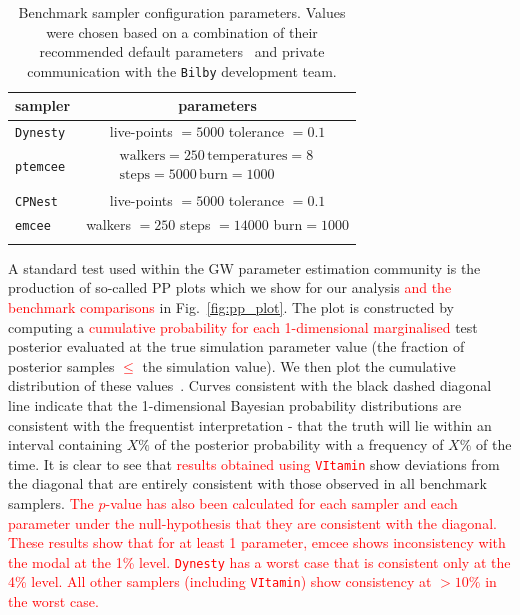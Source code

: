 \documentclass[%
showpacs,
nofootinbib,
 amsmath,amssymb,
 aps,
 twocolumn,
 prl,
 reprint,
floatfix,
]{revtex4-1}
\newcommand{\new}[1]{\textcolor{red}{#1}}
\begin{document}
%
%
\begin{table}
\centering
\caption{Benchmark sampler configuration parameters. Values were chosen based
on a combination of their recommended default parameters~\cite{1811.02042} and
private communication with the \texttt{Bilby} development team. }
\begin{tabular}[t]{lc}
\toprule
sampler & parameters \\
\hline
\texttt{Dynesty}~\cite{dynesty} & live-points $=5000$ tolerance $=0.1$ \\
\texttt{ptemcee}~\cite{ptemcee} & $\begin{array}{c}\text{walkers}=250\,
\text{temperatures}=8\,
\\ \text{steps}=5000\, \text{burn}=1000\end{array}$ \\
\texttt{CPNest}~\cite{cpnest} & live-points $=5000$ tolerance $=0.1$ \\
\texttt{emcee}~\cite{emcee} & walkers $=250$ steps $=14000$ burn$=1000$ \\
\botrule
\end{tabular}
\label{Tab:sampler_params}
\end{table}

%
%
A standard test used within the \ac{GW} parameter estimation community is the
production of so-called \ac{PP} plots which we show for our analysis \new{and
the benchmark comparisons} in Fig.~\ref{fig:pp_plot}. The plot is constructed
by computing a \new{cumulative probability for each 1-dimensional marginalised}
test posterior evaluated at the true simulation parameter value (the fraction
of posterior samples \new{$\leq$} the simulation value). We then plot the
cumulative distribution of these values~\cite{1409.7215}. Curves consistent
with the black dashed diagonal line indicate that the 1-dimensional Bayesian
probability distributions are consistent with the frequentist interpretation -
that the truth will lie within an interval containing $X\%$ of the posterior
probability with a frequency of $X\%$ of the time. It is clear to see that
\new{results obtained using \texttt{VItamin}} show deviations from the diagonal
that are entirely consistent with those observed in all benchmark samplers.
\new{The $p$-value has also been calculated for each sampler and each parameter
under the null-hypothesis that they are consistent with the diagonal. These
results show that for at least 1 parameter, emcee shows inconsistency with the
modal at the 1\% level. \texttt{Dynesty} has a worst case that is consistent only at the
4\% level.  All other samplers (including \texttt{VItamin}) show consistency at
$>10\%$ in the worst case.}    
\end{document}
